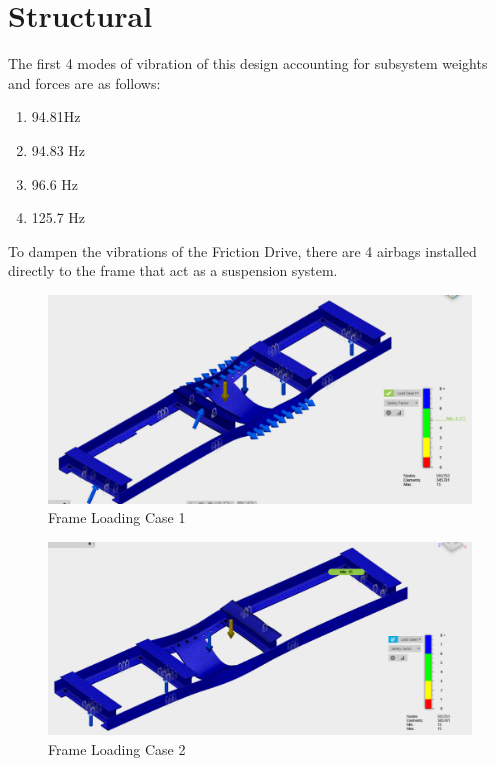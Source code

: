\documentclass[main.tex]{subfiles}
\begin{document}
    \section{Structural}
    The first 4 modes of vibration of this design accounting for subsystem weights and forces are as follows:
    \begin{enumerate}
    	\item 94.81Hz
    	\item 94.83 Hz
    	\item 96.6 Hz
    	\item 125.7 Hz
    \end{enumerate}
	To dampen the vibrations of the Friction Drive, there are 4 airbags installed directly to the frame that act as a suspension system.\\
    \begin{figure}
        \centering
        \includegraphics[width=\linewidth]{images/frame1}
        \caption{Frame Loading Case 1}
        \label{fig:frame1}
    \end{figure}
    \begin{figure}
        \centering
        \includegraphics[width=\linewidth]{images/frame2}
        \caption{Frame Loading Case 2}
        \label{fig:frame2}
    \end{figure}
\end{document}
